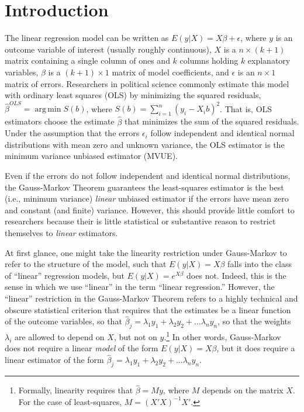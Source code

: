 \documentclass[12pt]{article}
\DeclareMathOperator*{\argmin}{arg\,min}
\begin{document}


\thispagestyle{empty}

\newpage
\doublespace

\section*{Introduction}

The linear regression model can be written as $E(y | X) = X\beta + \epsilon$, where $y$ is an outcome variable of interest (usually roughly continuous), $X$ is a $n \times (k + 1)$ matrix containing a single column of ones and $k$ columns holding $k$ explanatory variables, $\beta$ is a $(k + 1) \times 1$ matrix of model coefficients, and $\epsilon$ is an $n \times 1$ matrix of errors. Researchers in political science commonly estimate this model with ordinary least squares (OLS) by minimizing the squared residuals, $\hat{\beta}^{OLS} = \argmin S(b)$, where $S(b) = \sum_{i = 1}^n(y_i - X_ib)^2$. That is, OLS estimators choose the estimate $\hat{\beta}$ that minimizes the sum of the squared residuals. Under the assumption that the errors $\epsilon_i$ follow independent and identical normal distributions with mean zero and unknown variance, the OLS estimator is the minimum variance unbiased estimator (MVUE).

Even if the errors do not follow independent and identical normal distributions, the Gauss-Markov Theorem guarantees the least-squares estimator is the best (i.e., minimum variance) \textit{linear} unbiased estimator if the errors have mean zero and constant (and finite) variance. However, this should provide little comfort to researchers because their is little statistical or substantive reason to restrict themselves to \textit{linear} estimators.

At first glance, one might take the linearity restriction under Gauss-Markov to refer to the structure of the model, such that $E(y | X) = X\beta$ falls into the class of ``linear'' regression models, but  $E(y | X) = e^{X\beta}$ does not. Indeed, this is the sense in which we use ``linear'' in the term ``linear regression.'' However, the ``linear'' restriction in the Gauss-Markov Theorem refers to a highly technical and obscure statistical criterion that requires that the estimates be a linear function of the outcome variables, so that $\hat{\beta}_j = \lambda_1 y_1 + \lambda_2 y_2 + ... \lambda_n y_n$, so that the weights $\lambda_i$ are allowed to depend on $X$, but not on $y$.\footnote{Formally, linearity requires that $\hat{\beta} = My$, where $M$ depends on the matrix $X$. For the case of least-squares, $M = (X'X)^{-1}X'$.} In other words, Gauss-Markov does not require a linear \textit{model} of the form $E(y | X) = X\beta$, but it does require a linear estimator of the form $\hat{\beta}_j = \lambda_1 y_1 + \lambda_2 y_2 + ... \lambda_n y_n$. 
\end{document}
